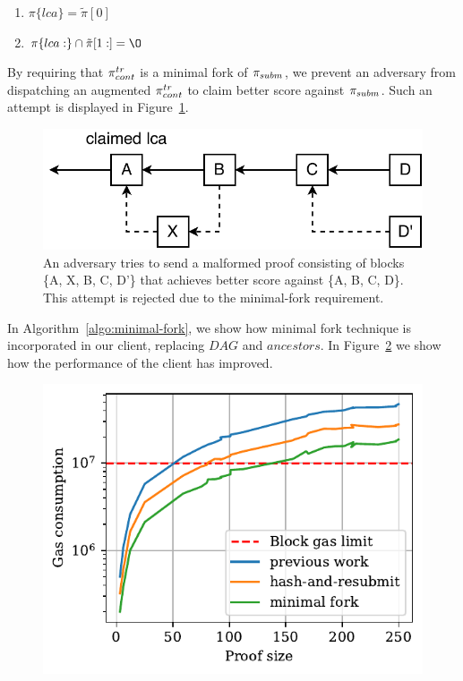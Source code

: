 \begin{enumerate}
\item $\pi\{lca\} = \tilde\pi[0]$
\item $\pi\{lca:\} \cap \tilde\pi[1:] = \O$
\end{enumerate}

By requiring that $\pi_{cont}^{tr}$ is a minimal fork of $\pi_{subm}$, we prevent an adversary
from dispatching an augmented $\pi_{cont}^{tr}$ to claim better score against $\pi_{subm}$.
Such an attempt is displayed in Figure~\ref{fig:adversary-minimal-fork}.

\begin{figure}[h]
    \begin{center}
        \includegraphics[width=0.78\columnwidth]{figures/adversary-minimal-fork.pdf}
    \end{center}

    \caption{An adversary tries to send a malformed proof consisting of blocks
    \{A, X, B, C, D'\} that achieves better score against \{A, B, C, D\}. This
    attempt is rejected due to the minimal-fork requirement.}

    \label{fig:adversary-minimal-fork}
\end{figure}

In Algorithm~\ref{algo:minimal-fork}, we show how minimal fork technique is
incorporated in our client, replacing $DAG$ and $ancestors$. In
Figure~\ref{fig:minimal-fork} we show how the performance of the client has
improved.



\begin{figure}[h]
    \begin{center}
        \includegraphics[width=1\columnwidth]{figures/minimal-fork.pdf}
    \end{center}
    \caption{}
    \label{fig:minimal-fork}
\end{figure}
